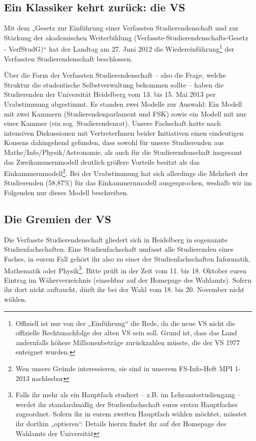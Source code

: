 \subsection{Ein Klassiker kehrt zurück: die VS}

Mit dem „Gesetz zur Einführung einer Verfassten Studierendenschaft und
zur Stärkung der akademischen Weiterbildung
(Verfasste-Studierendenschafts-Gesetz - VerfStudG)“ hat der Landtag am 27. Juni 2012
die Wiedereinführung\footnote{Offiziell ist nur von der „Einführung“ die
Rede, da die neue VS nicht die offizielle Rechtsnachfolge der alten VS sein soll.
Grund ist, dass das Land andernfalls höhere Millionenbeträge zurückzahlen müsste,
die der VS 1977 enteignet wurden.} der Verfassten Studierendenschaft beschlossen.

Über die Form der Verfassten Studierendenschaft -- also die Frage, welche
Struktur die studentische Selbstverwaltung bekommen sollte -- haben die Studierenden
der Universität Heidelberg vom 13. bis 15. Mai 2013 per Urabstimmung abgestimmt.
Es standen zwei Modelle zur Auswahl: Ein Modell mit zwei
Kammern (Studierendenparlament und FSK) sowie ein Modell mit nur einer
Kammer (ein sog. Studierendenrat). Unsere Fachschaft hatte nach intensiven Diskussionen mit
VertreterInnen beider Initiativen einen eindeutigen
Konsens dahingehend gefunden, dass sowohl für unsere Studierenden aus
Mathe/Info/Physik/Astronomie, als auch für die Studierendenschaft
insgesamt das Zweikammernmodell deutlich größere Vorteile besitzt als
das Einkammernmodell\footnote{Wen unsere Gründe interessieren, sie sind in unserem FS-Info-Heft MPI 1-2013 nachlesbar}.
Bei der Urabstimmung hat sich allerdings die Mehrheit der Studierenden (58,87\%)
für das Einkammernmodell ausgesprochen, weshalb wir im Folgenden nur dieses Modell beschreiben.



\subsection{Die Gremien der VS}

Die Verfasste Studierendenschaft gliedert sich in Heidelberg in sogenannte
Studienfachschaften. Eine Studienfachschaft umfasst alle
Studierenden eines Faches, in eurem Fall gehört ihr also zu einer der
Studienfachschaften Informatik, Mathematik oder Physik\footnote{Falls ihr
mehr als ein Hauptfach studiert -- z.B. im Lehramtsstudiengang -- werdet
ihr standardmäßig der Studienfachschaft eures ersten Hauptfaches zugeordnet.
Sofern ihr in eurem zweiten Hauptfach wählen möchtet, müsstet ihr dorthin „optieren“.
Details hierzu findet ihr auf der Homepage des Wahlamts der Universität}.
Bitte prüft in der Zeit vom 11. bis 18. Oktober euren Eintrag im Wäherverzeichnis
(einsehbar auf der Homepage des Wahlamts). Sofern ihr dort nicht auftaucht,
dürft ihr bei der Wahl vom 18. bis 20. November nicht wählen.

